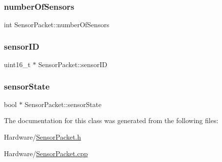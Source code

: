 \mbox{\label{class_sensor_packet_a10722ca574e0e8d7426e8b9f244cddd1}} 
\subsubsection{\texorpdfstring{number\+Of\+Sensors}{numberOfSensors}}
{\footnotesize\ttfamily int Sensor\+Packet\+::number\+Of\+Sensors\hspace{0.3cm}{\ttfamily [private]}}

\mbox{\label{class_sensor_packet_a20c88aab2eaafeb97d3cbe2d9755df98}} 
\subsubsection{\texorpdfstring{sensor\+ID}{sensorID}}
{\footnotesize\ttfamily uint16\+\_\+t $\ast$ Sensor\+Packet\+::sensor\+ID}

\mbox{\label{class_sensor_packet_ae8bf993c2ad176abc7ed277a7da9c6a8}} 
\subsubsection{\texorpdfstring{sensor\+State}{sensorState}}
{\footnotesize\ttfamily bool $\ast$ Sensor\+Packet\+::sensor\+State}



The documentation for this class was generated from the following files\+:\begin{DoxyCompactItemize}
\item 
Hardware/\mbox{\hyperlink{_sensor_packet_8h}{Sensor\+Packet.\+h}}\item 
Hardware/\mbox{\hyperlink{_sensor_packet_8cpp}{Sensor\+Packet.\+cpp}}\end{DoxyCompactItemize}

